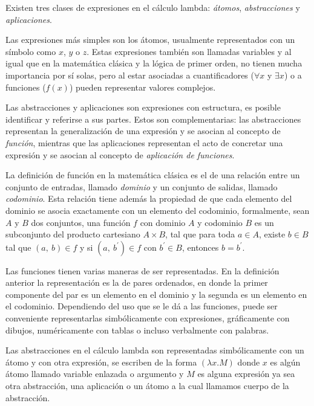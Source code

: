 Existen tres clases de expresiones en el cálculo lambda: \emph{átomos}, \emph{abstracciones} y \emph{aplicaciones}.

Las expresiones más simples son los átomos, usualmente representados con un símbolo como \( x \), \( y \) o \( z \). Estas expresiones también son llamadas variables y al igual que en la matemática clásica y la lógica de primer orden, no tienen mucha importancia por sí solas, pero al estar asociadas a cuantificadores (\( \forall x \) y \( \exists x \)) o a funciones (\( f(x) \)) pueden representar valores complejos.

Las abstracciones y aplicaciones son expresiones con estructura, es posible identificar y referirse a sus partes. Estos son complementarias: las abstracciones representan la generalización de una expresión y se asocian al concepto de \emph{función}, mientras que las aplicaciones representan el acto de concretar una expresión y se asocian al concepto de \emph{aplicación de funciones}.

La definición de función en la matemática clásica es el de una relación entre un conjunto de entradas, llamado \emph{dominio} y un conjunto de salidas, llamado \emph{codominio}. Esta relación tiene además la propiedad de que cada elemento del dominio se asocia exactamente con un elemento del codominio, formalmente, sean \( A \) y \( B \) dos conjuntos, una función \( f \) con dominio \( A \) y codominio \( B \) es un subconjunto del producto cartesiano \( A \times B \), tal que para toda \( a \in A \), existe \( b \in B \) tal que \( (a,\ b) \in f \) y si \( (a,\ b^{\prime}) \in f \) con \( b^{\prime} \in B \), entonces \( b=b^{\prime} \).

Las funciones tienen varias maneras de ser representadas. En la definición anterior la representación es la de pares ordenados, en donde la primer componente del par es un elemento en el dominio y la segunda es un elemento en el codominio. Dependiendo del uso que se le dá a las funciones, puede ser conveniente representarlas simbólicamente con expresiones, gráficamente con dibujos, numéricamente con tablas o incluso verbalmente con palabras.

Las abstracciones en el cálculo lambda son representadas simbólicamente con un átomo y con otra expresión, se escriben de la forma \( (λx.M) \) donde \( x \) es algún átomo llamado variable enlazada o argumento y \( M \) es alguna expresión ya sea otra abstracción, una aplicación o un átomo a la cual llamamos cuerpo de la abstracción.

